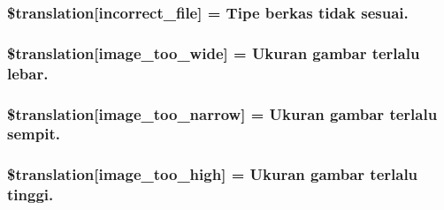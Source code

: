 \subsubsection[{\$translation}]{\setlength{\rightskip}{0pt plus 5cm}\$translation\mbox{[}\textquotesingle{}incorrect\+\_\+file\textquotesingle{}\mbox{]} = \textquotesingle{}Tipe berkas tidak sesuai.\textquotesingle{}}\label{class_8upload_8id___i_d_8php_a4d32343e2699edd6fd435f9c832cb9c7}
\hypertarget{class_8upload_8id___i_d_8php_a0dd3e4930ca1f59ae280f4b1006525cd}{}
\subsubsection[{\$translation}]{\setlength{\rightskip}{0pt plus 5cm}\$translation\mbox{[}\textquotesingle{}image\+\_\+too\+\_\+wide\textquotesingle{}\mbox{]} = \textquotesingle{}Ukuran gambar terlalu lebar.\textquotesingle{}}\label{class_8upload_8id___i_d_8php_a0dd3e4930ca1f59ae280f4b1006525cd}
\hypertarget{class_8upload_8id___i_d_8php_a5c9a4cd67fd21c32e0a3b434591a6037}{}
\subsubsection[{\$translation}]{\setlength{\rightskip}{0pt plus 5cm}\$translation\mbox{[}\textquotesingle{}image\+\_\+too\+\_\+narrow\textquotesingle{}\mbox{]} = \textquotesingle{}Ukuran gambar terlalu sempit.\textquotesingle{}}\label{class_8upload_8id___i_d_8php_a5c9a4cd67fd21c32e0a3b434591a6037}
\hypertarget{class_8upload_8id___i_d_8php_aa27bde361343f3b63c7cd441860024f8}{}
\subsubsection[{\$translation}]{\setlength{\rightskip}{0pt plus 5cm}\$translation\mbox{[}\textquotesingle{}image\+\_\+too\+\_\+high\textquotesingle{}\mbox{]} = \textquotesingle{}Ukuran gambar terlalu tinggi.\textquotesingle{}}\label{class_8upload_8id___i_d_8php_aa27bde361343f3b63c7cd441860024f8}
\hypertarget{class_8upload_8id___i_d_8php_a86fcd4e1157b00032df451188d735527}{}
